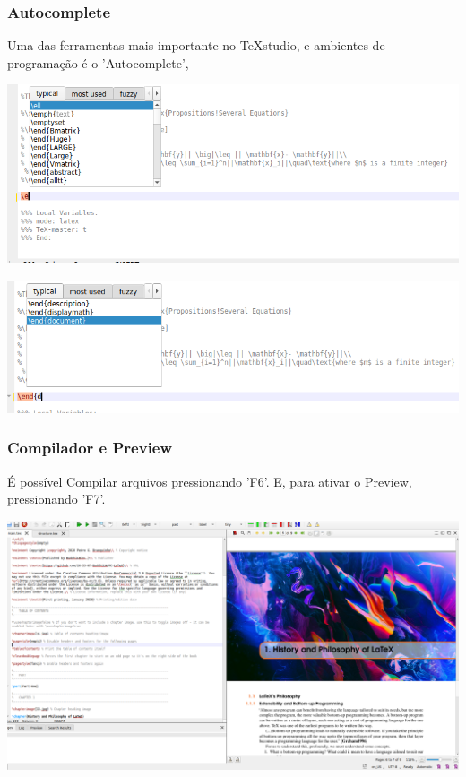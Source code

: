 \documentclass{beamer}
\begin{document}
\begin{frame}

  \frametitle{Autocomplete}
  \begin{tcolorbox}[fontupper=\fontsize{5mm}{5mm}, size=small, sharp corners]
  Uma das ferramentas mais importante no TeXstudio, e ambientes de
  programação é o 'Autocomplete',
  \end{tcolorbox}

  \begin{center}
    \includegraphics[scale=0.25]{../Imagens/Am3.png}
  \end{center}


  \begin{center}
    \includegraphics[scale=0.30]{../Imagens/Am4.png}
  \end{center}


\end{frame}



\begin{frame}

  \frametitle{Compilador e Preview}
  \begin{tcolorbox}[fontupper=\fontsize{4mm}{4mm}, size=small, sharp corners]
  É possível Compilar arquivos pressionando 'F6'. E, para ativar o
  Preview, pressionando 'F7'.
  \end{tcolorbox}

  \begin{center}
    \includegraphics[scale=0.17]{../Imagens/Am6.png}
  \end{center}


\end{frame}
\end{document}
